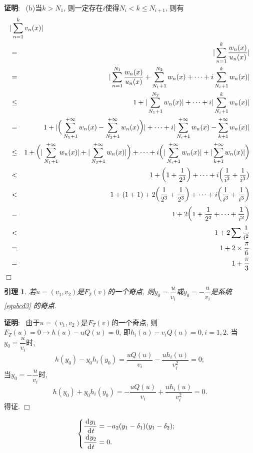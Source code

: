 \documentclass[a4paper,12pt,hyperref,twoside]{ctexart}
\newcommand{\dev}[2][]{{\,\textup{d}}^{#1}#2}   %
\newtheorem{lemma}[thm]{\phantom{参数}引理}
\numberwithin{equation}{section}
\newenvironment{proof}[1][\indent 证明]
    {\textbf {#1}:~}
    {\hfill $\Box$}
\begin{document}
\begin{proof}
(b)当$k>N_1$, 则一定存在$i$使得$N_i<k\leq N_{i+1}$, 则有\\
\begin{eqnarray*}
\lefteqn{\vert\sum_{n=1}^{k}v_n(x)\vert}\\
&=&\vert\sum_{n=1}^k\frac{w_n(x)}{u_n(x)}\vert\\
&=&\vert\sum_{n=1}^{N_1}\frac{w_n(x)}{u_n(x)} +\sum_{N_1+1}^{N_2}w_n(x)+\dots+i\sum_{N_i+1}^kw_n(x)\vert\\
&\le&1+\vert\sum_{N_1+1}^{N_2}w_n(x)\vert+\dots +i\vert\sum_{N_i+1}^kw_n(x)\vert\\
&=&1+\vert\bigg(\sum_{N_1+1}^{+\infty}w_n(x) -\sum_{N_2+1}^{+\infty}w_n(x)\bigg)\vert +\dots +i\vert\sum_{N_i+1}^{+\infty}w_n(x)-\sum_{k+1}^{+\infty}w_n(x)\vert\\
&\le&1+\bigg(\vert\sum_{N_1+1}^{+\infty}w_n(x)\vert+ \vert\sum_{N_2+1}^{+\infty}w_n(x)\vert\bigg)+\dots +i\bigg(\vert\sum_{N_i+1}^{+\infty}w_n(x)\vert +\vert\sum_{k+1}^{+\infty}w_n(x)\vert\bigg)\\
&<&1+\bigg(1+\frac1{2^3}\bigg)+\dots+i\bigg(\frac1{i^3}+\frac1{i^3}\big)\\
&<&1+(1+1)+2\bigg(\frac1{2^3}+\frac1{2^3}\bigg)+\dots +i\bigg(\frac1{i^3}+\frac1{i^3}\bigg)\\
&=&1+2\bigg(1+\frac{1}{2^2}+\dots+\frac{1}{i^2}\bigg)\\
&<&1+2\sum\frac{1}{i^2}\\
&=&1+2\times\frac\pi6\\
&=&1+\frac\pi3
\end{eqnarray*}
\end{proof}


\begin{lemma}\label{lem8}
若$u=(v_1, v_2)$是$F_T(v)$的一个奇点, 则$y_0=\dfrac{u}{v_i}$或$y_0=-\dfrac{u}{v_i}$是系统
\eqref{eqabcd3} 的奇点. %
\end{lemma}

\begin{proof}
由于$u=(v_1, v_2)$是$F_T(v)$的一个奇点, 则$F_T(u)=0 \rightarrow h(u)-uQ(u)=0$, 即$h_i(u)-v_i Q(u)=0, i=1, 2$.
\noindent 当$y_0=\dfrac{u}{v_i}$时,
    $$h(y_0)-y_0 h_i(y_0)=\dfrac{uQ(u)}{v_i}-\dfrac{u h_i(u)}{v_i^2}=0;$$
当$y_0=-\dfrac{u}{v_i}$时,
    $$h(y_0)+y_0 h_i(y_0)=-\dfrac{uQ(u)}{v_i}+\dfrac{u h_i(u)}{v_i^2}=0.$$
得证.
\end{proof}

\begin{spacing}{1}
$$\begin{cases}
\dfrac{\dev y_1}{\dev t}=-a_2(y_1-\delta_1)(y_1-\delta_2);\\[5pt]
\dfrac{\dev y_2}{\dev t}=0.
\end{cases}$$
\end{spacing}\bigskip
\end{document}

